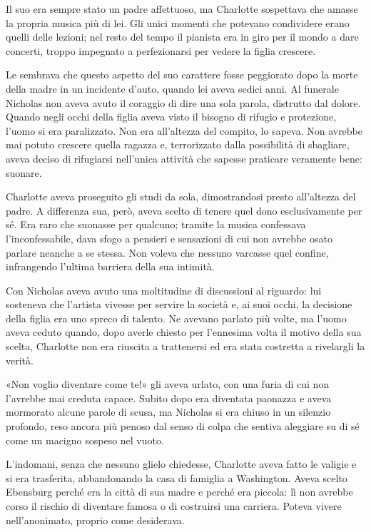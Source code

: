 \documentclass[a4paper,oneside,11pt]{memoir}
\begin{document}
Il suo era sempre stato un padre affettuoso, ma Charlotte sospettava che amasse la propria musica più di lei. Gli unici
momenti che potevano condividere erano quelli delle lezioni; nel resto del tempo il pianista era in giro per il mondo a
dare concerti, troppo impegnato a perfezionarsi per vedere la figlia crescere.

Le sembrava che questo aspetto del suo carattere fosse peggiorato dopo la morte della madre in un incidente d'auto,
quando lei aveva sedici anni. Al funerale Nicholas non aveva avuto il coraggio di dire una sola parola, distrutto dal
dolore. Quando negli occhi della figlia aveva visto il bisogno di rifugio e protezione, l'uomo si era paralizzato. Non
era all'altezza del compito, lo sapeva. Non avrebbe mai potuto crescere quella ragazza e, terrorizzato dalla
possibilità di sbagliare, aveva deciso di rifugiarsi nell'unica attività che sapesse praticare veramente bene:
suonare.

Charlotte aveva proseguito gli studi da sola, dimostrandosi presto all'altezza del padre. A differenza sua, però, aveva
scelto di tenere quel dono esclusivamente per sé. Era raro che suonasse per qualcuno; tramite la musica confessava
l'inconfessabile, dava sfogo a pensieri e sensazioni di cui non avrebbe osato parlare neanche a se stessa. Non voleva
che nessuno varcasse quel confine, infrangendo l'ultima barriera della sua intimità.

Con Nicholas aveva avuto una moltitudine di discussioni al riguardo: lui sosteneva che l'artista vivesse per servire la
società e, ai suoi occhi, la decisione della figlia era uno spreco di talento. Ne avevano parlato più volte, ma l'uomo
aveva ceduto quando, dopo averle chiesto per l'ennesima volta il motivo della sua scelta, Charlotte non era riuscita a
trattenersi ed era stata costretta a rivelargli la verità.

«Non voglio diventare come te!» gli aveva urlato, con una furia di cui non l'avrebbe mai creduta capace. Subito dopo
era diventata paonazza e aveva mormorato alcune parole di scusa, ma Nicholas si era chiuso in un silenzio profondo, reso
ancora più penoso dal senso di colpa che sentiva aleggiare su di sé come un macigno sospeso nel vuoto.

L'indomani, senza che nessuno glielo chiedesse, Charlotte aveva fatto le valigie e si era trasferita, abbandonando la
casa di famiglia a Washington. Aveva scelto Ebensburg perché era la città di sua madre e perché era piccola: lì non
avrebbe corso il rischio di diventare famosa o di costruirsi una carriera. Poteva vivere nell'anonimato, proprio come
desiderava.
\end{document}
